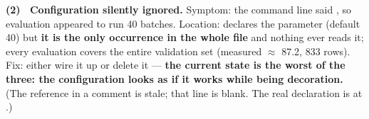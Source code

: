 \documentclass[11pt,openany]{article}
\begin{document}
\textbf{(2) \ Configuration silently ignored.} Symptom: the command line said
\linebreak[0], so evaluation appeared to run 40 batches. Location:
\linebreak[0]\linebreak[0] declares the parameter (default 40) but \textbf{it is the only
occurrence in the whole file} and nothing ever reads it; every evaluation covers the entire
validation set (measured \linebreak[0]\linebreak[0]\linebreak[0] $\approx$ 87.2, 833 rows). Fix: either
wire it up or delete it --- \textbf{the current state is the worst of the three: the configuration
looks as if it works while being decoration.} (The  reference in a
\linebreak[0]\linebreak[0] comment is stale; that line is blank. The real declaration is at
.)
\end{document}

